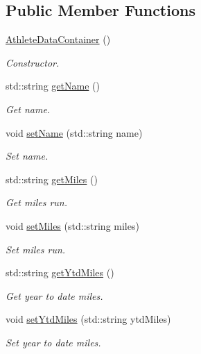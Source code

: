 \subsection*{Public Member Functions}
\begin{DoxyCompactItemize}
\item 
\mbox{\hyperlink{classAthleteDataContainer_ad268a2095024e3d0f3dfb552baad1e55}{Athlete\+Data\+Container}} ()
\begin{DoxyCompactList}\small\item\em Constructor. \end{DoxyCompactList}\item 
std\+::string \mbox{\hyperlink{classAthleteDataContainer_a5a161d7bd2393b0c5fe025b191008ffc}{get\+Name}} ()
\begin{DoxyCompactList}\small\item\em Get name. \end{DoxyCompactList}\item 
void \mbox{\hyperlink{classAthleteDataContainer_a486090438f2dfc3308ddc762ec414ee3}{set\+Name}} (std\+::string name)
\begin{DoxyCompactList}\small\item\em Set name. \end{DoxyCompactList}\item 
std\+::string \mbox{\hyperlink{classAthleteDataContainer_a6c2eae055dab923923bea0226e557baa}{get\+Miles}} ()
\begin{DoxyCompactList}\small\item\em Get miles run. \end{DoxyCompactList}\item 
void \mbox{\hyperlink{classAthleteDataContainer_a544e5714631cf94ffa8eb2891090af85}{set\+Miles}} (std\+::string miles)
\begin{DoxyCompactList}\small\item\em Set miles run. \end{DoxyCompactList}\item 
std\+::string \mbox{\hyperlink{classAthleteDataContainer_a708d78fd02b93cb9b27a358f7ff458fa}{get\+Ytd\+Miles}} ()
\begin{DoxyCompactList}\small\item\em Get year to date miles. \end{DoxyCompactList}\item 
void \mbox{\hyperlink{classAthleteDataContainer_aae9279049adc3c9e85d1f5c3add60c88}{set\+Ytd\+Miles}} (std\+::string ytd\+Miles)
\begin{DoxyCompactList}\small\item\em Set year to date miles. \end{DoxyCompactList}\item 

\end{DoxyCompactItemize}
